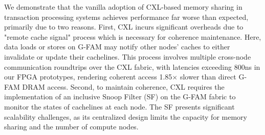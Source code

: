 We demonstrate that the vanilla adoption of CXL-based memory sharing in transaction processing systems achieves performance far worse than expected, primarily due to two reasons. First, CXL incurs significant overheads due to "remote cache signal" process which is necessary for coherence maintenance. Here, data loads or stores on G-FAM may notify other nodes' caches to either invalidate or update their cachelines. This process involves multiple cross-node communication roundtrips over the CXL fabric, with latencies exceeding 800ns in our FPGA prototypes, rendering coherent access 1.85$\times$ slower than direct G-FAM DRAM access. Second, to maintain coherence, CXL requires the implementation of an inclusive Snoop Filter (SF) on the G-FAM fabric to monitor the states of cachelines at each node. The SF presents significant scalability challenges, as its centralized design limits the capacity for memory sharing and the number of compute nodes.








